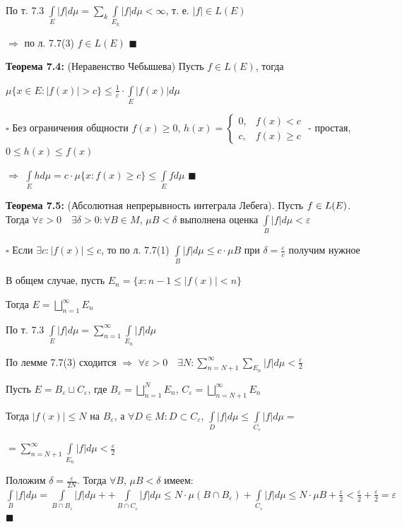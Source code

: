 \documentclass[a4paper]{report}
\newcommand*{\hm}[1]{#1\nobreak\discretionary{}%
            {\hbox{$\mathsurround=0pt #1$}}{}}
\begin{document}
По т. 7.3 $\displaystyle\int\limits_E|f|d\mu=\sum\limits_k\displaystyle\int\limits_{E_k}|f|d\mu<\infty$, т. е. $|f|\in L(E)$ 

$\Rightarrow$ по л. 7.7(3) $f\in L(E)$ $\blacksquare$
\bigskip

\noindent\textbf{Теорема 7.4:} (Неравенство Чебышева) Пусть $f\in L(E)$, тогда 

$\mu\{x\in E\colon|f(x)|>c\}\le\frac1c\cdot\displaystyle\int\limits_E|f(x)|d\mu$

\noindent $\square$ Без ограничения общности $f(x)\ge0$, $h(x)=\begin{cases}0,&f(x)<c\\c,&f(x)\ge c\end{cases}$ - простая, $0\le h(x)\le f(x)$

$\Rightarrow$ $\displaystyle\int\limits_E hd\mu=c\cdot\mu\{x\colon f(x)\ge c\}\le\displaystyle\int\limits_E fd\mu$ $\blacksquare$
\bigskip

\noindent\textbf{Теорема 7.5:} (Абсолютная непрерывность интеграла Лебега). Пусть $f\hm\in L(E)$. Тогда $\forall\varepsilon>0\quad\exists\delta>0\colon\forall B\in M$,
$\mu B<\delta$ выполнена оценка $\displaystyle\int\limits_B|f|d\mu<\varepsilon$

\noindent $\square$ Если $\exists c\colon|f(x)|\le c$, то по л. 7.7(1) $\displaystyle\int\limits_B|f|d\mu\le c\cdot\mu B$ при $\delta=\frac{\varepsilon}{c}$ получим нужное

В общем случае, пусть $E_n=\{x\colon n-1\le|f(x)|<n\}$

Тогда $E=\bigsqcup\limits_{n=1}^\infty E_n$

По т. 7.3 $\displaystyle\int\limits_E|f|d\mu=\sum\limits_{n=1}^\infty\displaystyle\int\limits_{E_n}|f|d\mu$

По лемме 7.7(3) сходится $\Rightarrow$ $\forall\varepsilon>0\quad\exists N\colon\sum\limits_{n=N+1}^\infty\sum\limits_{E_n}|f|d\mu<\frac\varepsilon2$

Пусть $E=B_\varepsilon\sqcup C_\varepsilon$, где $B_\varepsilon=\bigsqcup\limits_{n=1}^N E_n$, $C_\varepsilon=\bigsqcup\limits_{n=N+1}^\infty E_n$

Тогда $|f(x)|\le N$ на $B_\varepsilon$, а $\forall D\in M\colon D\subset C_\varepsilon$, $\displaystyle\int\limits_D|f|d\mu\le\displaystyle\int\limits_{C_\varepsilon}|f|d\mu=$

\noindent $=\sum\limits_{n=N+1}^\infty\displaystyle\int\limits_{E_n}|f|d\mu<\frac\varepsilon2$

Положим $\delta=\displaystyle\frac{\varepsilon}{2N}$. Тогда $\forall B$, $\mu B<\delta$ имеем: $\displaystyle\int\limits_B|f|d\mu=\displaystyle\int\limits_{B\cap B_\varepsilon}|f|d\mu++\displaystyle\int\limits_{B\cap
C_\varepsilon}|f|d\mu\le N\cdot\mu(B\cap B_\varepsilon)+\displaystyle\int\limits_{C_\varepsilon}|f|d\mu\le N\cdot\mu B+\frac\varepsilon2<\frac\varepsilon2+\frac\varepsilon2=\varepsilon$ $\blacksquare$
\bigskip
\end{document}
